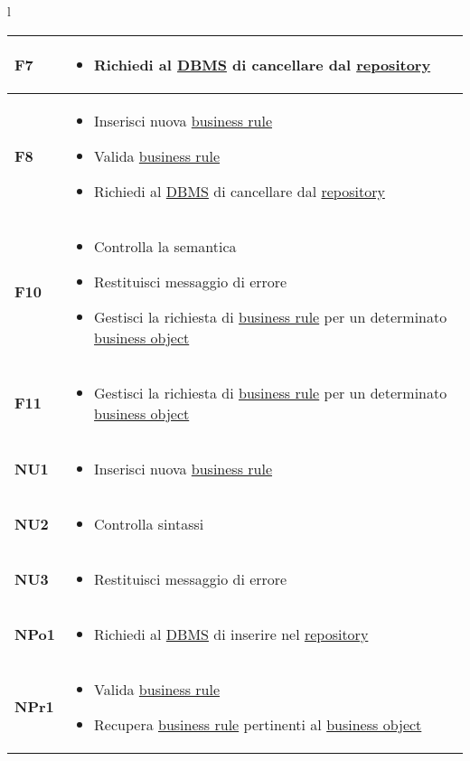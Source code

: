 {\begin{tabular}{l}
\begin{tabular}{||p{2cm}||p{10cm}||} \hline
\textbf{F7} & \begin{itemize}
\item Richiedi al \underline{DBMS} di cancellare dal \underline{repository}
\end{itemize}\\ \hline


\textbf{F8} & \begin{itemize}
\item Inserisci nuova \underline{business rule}
\item Valida \underline{business rule}
\item Richiedi al \underline{DBMS} di cancellare dal \underline{repository}
\end{itemize} \\ \hline
\textbf{F10} & \begin{itemize}
\item Controlla la semantica
\item Restituisci messaggio di errore
\item Gestisci la richiesta di \underline{business rule} per un determinato \underline{business object}
\end{itemize} \\ \hline
\textbf{F11} & \begin{itemize}
\item Gestisci la richiesta di \underline{business rule} per un determinato \underline{business object}
\end{itemize} \\ \hline
\textbf{NU1} & \begin{itemize}
\item Inserisci nuova \underline{business rule}
\end{itemize} \\ \hline
\textbf{NU2} & \begin{itemize}
\item Controlla sintassi
\end{itemize} \\ \hline
\textbf{NU3} & \begin{itemize}
\item Restituisci messaggio di errore
\end{itemize} \\ \hline
\textbf{NPo1} & \begin{itemize}
\item Richiedi al \underline{DBMS} di inserire nel \underline{repository}
\end{itemize} \\ \hline
\textbf{NPr1} & \begin{itemize}
\item Valida \underline{business rule}
\item Recupera \underline{business rule} pertinenti al \underline{business object}
\end{itemize} \\ \hline


\end{tabular}
\end{tabular}}
